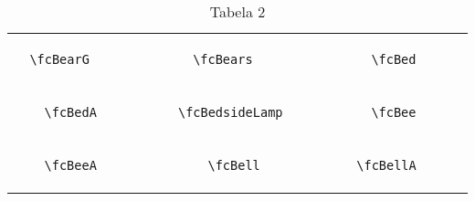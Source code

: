 \documentclass[x11names]{article}
\begin{document}
\begin{table}[H]
\begin{tabular}{|c|c|c|c|c|c|}
		&\multirow{5}{*}{	\fcBearG	[scale=0.4]} & &\multirow{5}{*}{	\fcBears	[scale=0.4]} & &\multirow{5}{*}{	\fcBed	[scale=0.3]}\\	& & & & & \\	& & & & & \\	\verb|	\fcBearG	| & & \verb|	\fcBears	| & & \verb|	\fcBed	| & \\	& & & & & \\	& & & & & \\	& & & & & \\	\hline									
		&\multirow{5}{*}{	\fcBedA	[scale=0.4]} & &\multirow{5}{*}{	\fcBedsideLamp	[scale=0.4]} & &\multirow{5}{*}{	\fcBee	[scale=0.8]}\\	& & & & & \\	& & & & & \\	\verb|	\fcBedA	| & & \verb|	\fcBedsideLamp	| & & \verb|	\fcBee	| & \\	& & & & & \\	& & & & & \\	& & & & & \\	\hline									
		&\multirow{5}{*}{	\fcBeeA	[scale=0.8]} & &\multirow{5}{*}{	\fcBell	[scale=0.8]} & &\multirow{5}{*}{	\fcBellA	[scale=0.8]}\\	& & & & & \\	& & & & & \\	\verb|	\fcBeeA	| & & \verb|	\fcBell	| & & \verb|	\fcBellA	| & \\	& & & & & \\	& & & & & \\	& & & & & \\		\hline 	\hline 	\end{tabular}	\caption{	Tabela 2	}\label{	Tab2	}\end{table}
\end{document}
